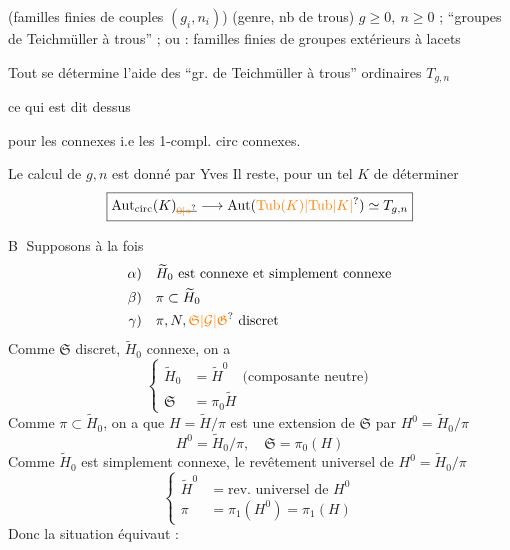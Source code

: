 

(familles finies de couples \((g_i,n_i)\)) (genre, nb de trous) \(g\geq0,\ n\geq0\) ; ``groupes de Teichmüller à trous'' ; ou : familles finies de groupes extérieurs à lacets

Tout se détermine  l'aide des ``gr. de Teichmüller à trous'' ordinaires \(T_{g,n}\)

ce qui est dit dessus

pour les   connexes i.e les 1-compl. circ connexes.

Le calcul de \(g,n\) est donné par Yves Il reste, pour un tel \(K\)  de déterminer
\[
 \boxed{\mathrm{Aut}_{\mathrm{circ}}(K)_{\deleted{\unsure{0|*}}}
 \longrightarrow\mathrm{Aut}(\unsure{\mathrm{Tub}(K)|\mathrm{Tub}\lvert K\rvert})\simeq T_{g,n}}
\]

\textcircled{B}
Supposons à la fois
\[
\begin{aligned}
\alpha)&\quad \widetilde H_0\ \text{est connexe et simplement connexe}\\
\beta)&\quad \pi\subset\widetilde H_0\\
\gamma)&\quad \pi,N,\unsure{\mathfrak{S}|\mathcal{G}|\mathfrak{G}}\ \text{discret}
\end{aligned}
\]
Comme \(\mathfrak{S}\) discret, \(\widetilde H_0\) connexe, on a
\[
\boxed{\left\{\begin{aligned}
\widetilde H_0&=\widetilde H^{0}\quad\text{(composante neutre)}\\
\mathfrak{S}&=\pi_0\widetilde H
\end{aligned}\right.}
\]
Comme \(\pi\subset\widetilde H_0\), on a que \(H=\widetilde H/\pi\) est une extension de \(\mathfrak{S}\) par \(H^0=\widetilde H_0/\pi\)
\[
\boxed{H^0=\widetilde H_0/\pi,\quad \mathfrak{S}=\pi_0(H)}
\]
Comme \(\widetilde H_0\) est simplement connexe,  le revêtement universel de \(H^0=\widetilde H_0/\pi\)
\[
\boxed{\left\{\begin{aligned}
\widetilde H^{0}&=\text{rev. universel de }H^0\\
\pi&=\pi_1(H^0)=\pi_1(H)
\end{aligned}\right.}
\]
Donc la situation équivaut :

